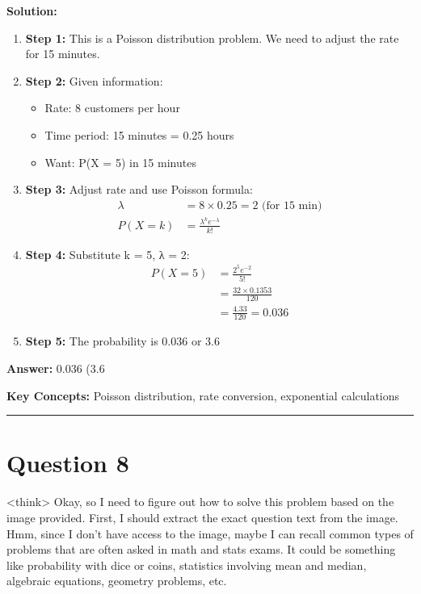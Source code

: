 \documentclass[12pt]{article}
\begin{document}
\textbf{Solution:}
\begin{enumerate}
\item \textbf{Step 1:} This is a Poisson distribution problem. We need to adjust the rate for 15 minutes.

\item \textbf{Step 2:} Given information:
\begin{itemize}
\item Rate: 8 customers per hour
\item Time period: 15 minutes = 0.25 hours  
\item Want: P(X = 5) in 15 minutes
\end{itemize}

\item \textbf{Step 3:} Adjust rate and use Poisson formula:
\begin{align}
\lambda &= 8 \times 0.25 = 2 \text{ (for 15 min)} \\
P(X = k) &= \frac{\lambda^k e^{-\lambda}}{k!}
\end{align}

\item \textbf{Step 4:} Substitute k = 5, λ = 2:
\begin{align}
P(X = 5) &= \frac{2^5 e^{-2}}{5!} \\
&= \frac{32 \times 0.1353}{120} \\
&= \frac{4.33}{120} = 0.036
\end{align}

\item \textbf{Step 5:} The probability is 0.036 or 3.6%
\end{enumerate}

\textbf{Answer:} 0.036 (3.6%

\textbf{Key Concepts:} Poisson distribution, rate conversion, exponential calculations

\hrule
\vspace{1em}

\newpage

\section{Question 8}

<think>
Okay, so I need to figure out how to solve this problem based on the image provided. First, I should extract the exact question text from the image. Hmm, since I don't have access to the image, maybe I can recall common types of problems that are often asked in math and stats exams. It could be something like probability with dice or coins, statistics involving mean and median, algebraic equations, geometry problems, etc.
\end{document}
